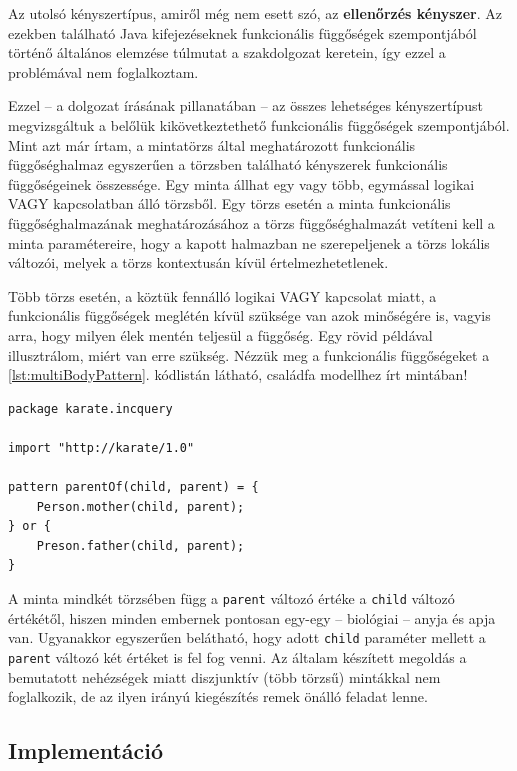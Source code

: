 Az utolsó kényszertípus, amiről még nem esett szó, az \textbf{ellenőrzés kényszer}.
Az ezekben található Java kifejezéseknek funkcionális függőségek szempontjából történő általános elemzése túlmutat a szakdolgozat keretein, így ezzel a problémával nem foglalkoztam.

Ezzel -- a dolgozat írásának pillanatában -- az összes lehetséges kényszertípust megvizsgáltuk a belőlük kikövetkeztethető funkcionális függőségek szempontjából.
Mint azt már írtam, a mintatörzs által meghatározott funkcionális függőséghalmaz egyszerűen a törzsben található kényszerek funkcionális függőségeinek összessége.
Egy minta állhat egy vagy több, egymással logikai VAGY kapcsolatban álló törzsből.
Egy törzs esetén a minta funkcionális függőséghalmazának meghatározásához a törzs függőséghalmazát vetíteni kell a minta paramétereire, hogy a kapott halmazban ne szerepeljenek a törzs lokális változói, melyek a törzs kontextusán kívül értelmezhetetlenek.

Több törzs esetén, a köztük fennálló logikai VAGY kapcsolat miatt, a funkcionális függőségek meglétén kívül szüksége van azok minőségére is, vagyis arra, hogy milyen élek mentén teljesül a függőség.
Egy rövid példával illusztrálom, miért van erre szükség.
Nézzük meg a funkcionális függőségeket a \ref{lst:multiBodyPattern}. kódlistán látható, családfa modellhez írt mintában!
\begin{lstlisting}[float,floatplacement=htb,caption=Példa több törzsű mintára,label=lst:multiBodyPattern]
package karate.incquery

import "http://karate/1.0"

pattern parentOf(child, parent) = {
    Person.mother(child, parent);
} or {
    Preson.father(child, parent);
}
\end{lstlisting}
A minta mindkét törzsében függ a \texttt{parent} változó értéke a \texttt{child} változó értékétől, hiszen minden embernek pontosan egy-egy -- biológiai -- anyja és apja van. Ugyanakkor egyszerűen belátható, hogy adott \texttt{child} paraméter mellett a \texttt{parent} változó két értéket is fel fog venni.
Az általam készített megoldás a bemutatott nehézségek miatt diszjunktív (több törzsű) mintákkal nem foglalkozik, de az ilyen irányú kiegészítés remek önálló feladat lenne.

\subsection{Implementáció}

